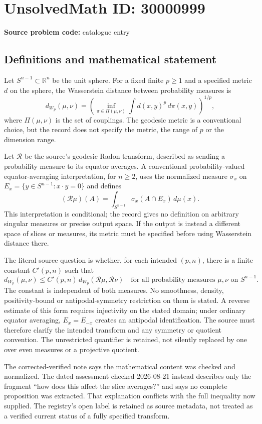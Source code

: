 \documentclass[11pt]{article}
\newcommand{\R}{\mathbb{R}}
\begin{document}
\section*{UnsolvedMath ID: 30000999}
\textbf{Source problem code:} catalogue entry
\subsection{Definitions and mathematical statement}
Let $S^{n-1}\subset\R^n$ be the unit sphere. For a fixed finite $p\geq1$ and a specified metric $d$ on the sphere, the Wasserstein distance between probability measures is
\[
d_{W_p}(\mu,\nu)=
\left(\inf_{\pi\in\Pi(\mu,\nu)}\int d(x,y)^p\,d\pi(x,y)\right)^{1/p},
\]
where $\Pi(\mu,\nu)$ is the set of couplings. The geodesic metric is a conventional choice, but the record does not specify the metric, the range of $p$ or the dimension range.

Let $\mathcal R$ be the source's geodesic Radon transform, described as sending a probability measure to its equator averages. A conventional probability-valued equator-averaging interpretation, for $n\geq2$, uses the normalized measure $\sigma_x$ on $E_x=\{y\in S^{n-1}:x\cdot y=0\}$ and defines
\[
(\mathcal R\mu)(A)=\int_{S^{n-1}}\sigma_x(A\cap E_x)\,d\mu(x).
\]
This interpretation is conditional; the record gives no definition on arbitrary singular measures or precise output space. If the output is instead a different space of slices or measures, its metric must be specified before using Wasserstein distance there.

The literal source question is whether, for each intended $(p,n)$, there is a finite constant $C'(p,n)$ such that
\[
d_{W_p}(\mu,\nu)\leq C'(p,n)\,
d_{W_p}(\mathcal R\mu,\mathcal R\nu)
\quad\text{for all probability measures }\mu,\nu\text{ on }S^{n-1}.
\]
The constant is independent of both measures. No smoothness, density, positivity-bound or antipodal-symmetry restriction on them is stated. A reverse estimate of this form requires injectivity on the stated domain; under ordinary equator averaging, $E_x=E_{-x}$ creates an antipodal identification. The source must therefore clarify the intended transform and any symmetry or quotient convention. The unrestricted quantifier is retained, not silently replaced by one over even measures or a projective quotient.

The corrected-verified note says the mathematical content was checked and normalized. The dated assessment checked 2026-08-21 instead describes only the fragment ``how does this affect the slice averages?'' and says no complete proposition was extracted. That explanation conflicts with the full inequality now supplied. The registry's open label is retained as source metadata, not treated as a verified current status of a fully specified transform.
\end{document}
